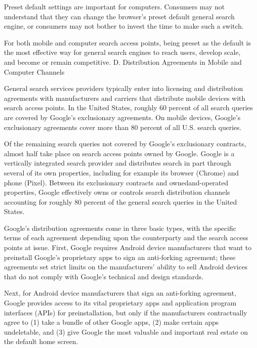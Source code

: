 \documentclass[11pt,b5paper]{scrartcl}
\begin{document}

Preset default settings are important for computers. Consumers may not
understand that they can change the browser’s preset default general search engine, or consumers
may not bother to invest the time to make such a switch.


For both mobile and computer search access points, being preset as the default is
the most effective way for general search engines to reach users, develop scale, and become or
remain competitive.
D.
Distribution Agreements in Mobile and Computer Channels


General search services providers typically enter into licensing and distribution
agreements with manufacturers and carriers that distribute mobile devices with search access
points. In the United States, roughly 60 percent of all search queries are covered by Google’s
exclusionary agreements. On mobile devices, Google’s exclusionary agreements cover more than
80 percent of all U.S. search queries.


Of the remaining search queries not covered by Google’s exclusionary contracts,
almost half take place on search access points owned by Google. Google is a vertically integrated
search provider and distributes search in part through several of its own properties, including for
example its browser (Chrome) and phone (Pixel). Between its exclusionary contracts and ownedand-operated properties, Google effectively owns or controls search distribution channels
accounting for roughly 80 percent of the general search queries in the United States.


Google’s distribution agreements come in three basic types, with the specific
terms of each agreement depending upon the counterparty and the search access points at issue.
First, Google requires Android device manufacturers that want to preinstall Google’s proprietary
apps to sign an anti-forking agreement; these agreements set strict limits on the manufacturers’
ability to sell Android devices that do not comply with Google’s technical and design standards.


Next, for Android device manufacturers that sign an anti-forking agreement,
Google provides access to its vital proprietary apps and application program interfaces (APIs) for
preinstallation, but only if the manufacturers contractually agree to (1) take a bundle of other
Google apps, (2) make certain apps undeletable, and (3) give Google the most valuable and
important real estate on the default home screen.
\end{document}
